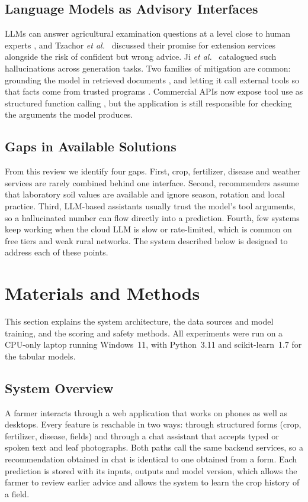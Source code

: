 \documentclass[conference]{IEEEtran}
\begin{document}
\subsection{Language Models as Advisory Interfaces}
LLMs can answer agricultural examination questions at a level close to human experts \cite{silva2023}, and Tzachor \emph{et al.}\ \cite{tzachor2023} discussed their promise for extension services alongside the risk of confident but wrong advice. Ji \emph{et al.}\ \cite{ji2023} catalogued such hallucinations across generation tasks. Two families of mitigation are common: grounding the model in retrieved documents \cite{lewis2020}, and letting it call external tools so that facts come from trusted programs \cite{schick2023,yao2023}. Commercial APIs now expose tool use as structured function calling \cite{gemini_fc}, but the application is still responsible for checking the arguments the model produces.

\subsection{Gaps in Available Solutions}
From this review we identify four gaps. First, crop, fertilizer, disease and weather services are rarely combined behind one interface. Second, recommenders assume that laboratory soil values are available and ignore season, rotation and local practice. Third, LLM-based assistants usually trust the model's tool arguments, so a hallucinated number can flow directly into a prediction. Fourth, few systems keep working when the cloud LLM is slow or rate-limited, which is common on free tiers and weak rural networks. The system described below is designed to address each of these points.

\section{Materials and Methods}

This section explains the system architecture, the data sources and model training, and the scoring and safety methods. All experiments were run on a CPU-only laptop running Windows~11, with Python~3.11 and scikit-learn~1.7 \cite{pedregosa2011} for the tabular models.

\subsection{System Overview}
A farmer interacts through a web application that works on phones as well as desktops. Every feature is reachable in two ways: through structured forms (crop, fertilizer, disease, fields) and through a chat assistant that accepts typed or spoken text and leaf photographs. Both paths call the same backend services, so a recommendation obtained in chat is identical to one obtained from a form. Each prediction is stored with its inputs, outputs and model version, which allows the farmer to review earlier advice and allows the system to learn the crop history of a field.
\end{document}
